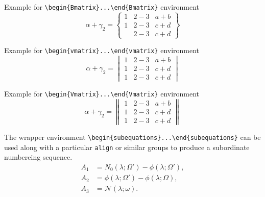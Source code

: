 \documentclass[numbers,webpdf,imaiai]{ima-authoring-template}%
\theoremstyle{thmstyleone}%
\theoremstyle{thmstyletwo}%
\theoremstyle{thmstylethree}%
\numberwithin{equation}{section}
\begin{document}
Example for \verb+\begin{Bmatrix}...\end{Bmatrix}+ environment
\begin{equation*}
\alpha + \gamma_{2} = \begin{Bmatrix}
1 &2-3 &a+b\\
1 &2-3 &c+d\\
  &2-3 &c+d
\end{Bmatrix}
\end{equation*}

Example for \verb+\begin{vmatrix}...\end{vmatrix}+ environment
\begin{equation*}
\alpha + \gamma_{2} = \begin{vmatrix}
1 &2-3 &a+b\\
1 &2-3 &c+d\\
1 &2-3 &c+d
\end{vmatrix}
\end{equation*}

Example for \verb+\begin{Vmatrix}...\end{Vmatrix}+ environment
\begin{equation*}
\alpha + \gamma_{2} = \begin{Vmatrix}
1 &2-3 &a+b\\
1 &2-3 &c+d\\
1 &2-3 &c+d
\end{Vmatrix}
\end{equation*}



The wrapper environment \verb+\begin{subequations}...\end{subequations}+ can be used along with a particular
\verb+align+ or similar groups to produce a subordinate numbereing sequence.
\begin{subequations}
\begin{align}
A_1 &= N_0(\lambda;\Omega')-\phi(\lambda;\Omega'), \nonumber\\
A_2 &= \phi(\lambda;\Omega')-\phi(\lambda;\Omega), \\
A_3 &= \mathcal{N}(\lambda;\omega).
\end{align}
\end{subequations}
\end{document}
